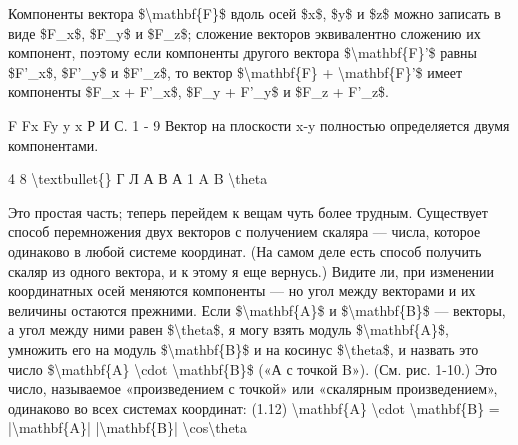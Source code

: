 \documentclass[10pt,oneside]{article}
\begin{document}
Компоненты вектора \$\textbackslash{}mathbf\{F\}\$ вдоль осей \$x\$, \$y\$ и \$z\$ можно записать в виде \$F\_x\$, \$F\_y\$ и \$F\_z\$; сложение векторов эквивалентно сложению их компонент, поэтому если компоненты другого вектора \$\textbackslash{}mathbf\{F\}'\$ равны \$F'\_x\$, \$F'\_y\$ и \$F'\_z\$, то вектор \$\textbackslash{}mathbf\{F\} + \textbackslash{}mathbf\{F\}'\$ имеет компоненты \$F\_x + F'\_x\$, \$F\_y + F'\_y\$ и \$F\_z + F'\_z\$.\par

F Fx Fy y x Р И С. 1 - 9 Вектор на плоскости x-y полностью определяется двумя компонентами.\par

4 8 \textbackslash{}textbullet\{\} Г Л А В А   1 A B \textbackslash{}theta\par

Это простая часть; теперь перейдем к вещам чуть более трудным. Существует способ перемножения двух векторов с получением скаляра --- числа, которое одинаково в любой системе координат. (На самом деле есть способ получить скаляр из одного вектора, и к этому я еще вернусь.) Видите ли, при изменении координатных осей меняются компоненты --- но угол между векторами и их величины остаются прежними. Если \$\textbackslash{}mathbf\{A\}\$ и \$\textbackslash{}mathbf\{B\}\$ --- векторы, а угол между ними равен \$\textbackslash{}theta\$, я могу взять модуль \$\textbackslash{}mathbf\{A\}\$, умножить его на модуль \$\textbackslash{}mathbf\{B\}\$ и на косинус \$\textbackslash{}theta\$, и назвать это число \$\textbackslash{}mathbf\{A\} \textbackslash{}cdot \textbackslash{}mathbf\{B\}\$ («А с точкой B»). (См. рис. 1-10.) Это число, называемое «произведением с точкой» или «скалярным произведением», одинаково во всех системах координат: (1.12) \textbackslash{}mathbf\{A\} \textbackslash{}cdot \textbackslash{}mathbf\{B\} = |\textbackslash{}mathbf\{A\}| |\textbackslash{}mathbf\{B\}| \textbackslash{}cos\textbackslash{}theta\par
\end{document}
